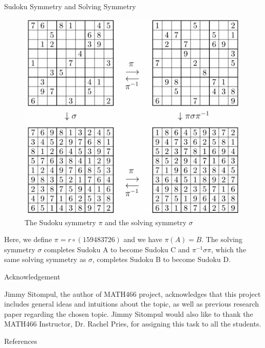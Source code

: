 \documentclass[final]{beamer}
\newlength{\colwidth}
\begin{document}
\begin{frame}[t]
\begin{columns}[t]
\begin{column}{\colwidth}
    \begin{block}{\Large Sudoku Symmetry and Solving Symmetry}
    \begin{figure}
        \centering
        \includegraphics[scale=0.65]{pic/IMG_0943.jpg}
        \caption{The Sudoku symmetry $\pi$ and the solving symmetry $\sigma$}
        \label{fig:my_label}
    \end{figure}
    \large Here, we define $\pi=r \circ (159483726)$ and we have $\pi(A)=B$. The solving symmetry $\sigma$ completes Sudoku A to become Sudoku C and $\pi^{-1}\sigma\pi$, which the same solving symmetry as $\sigma$, completes Sudoku B to become Sudoku D.
  \end{block}


  \begin{alertblock}{\Large Acknowledgement}

    Jimmy Sitompul, the author of MATH466 project, acknowledges that this project includes general ideas and intuitions about the topic, as well as previous research paper regarding the chosen topic. Jimmy Sitompul would also like to thank the MATH466 Instructor, Dr. Rachel Pries, for assigning this task to all the students. 
    
  \end{alertblock}

  \begin{alertblock}{\Large References}


\end{alertblock}
\end{column}
\end{columns}
\end{frame}
\end{document}
